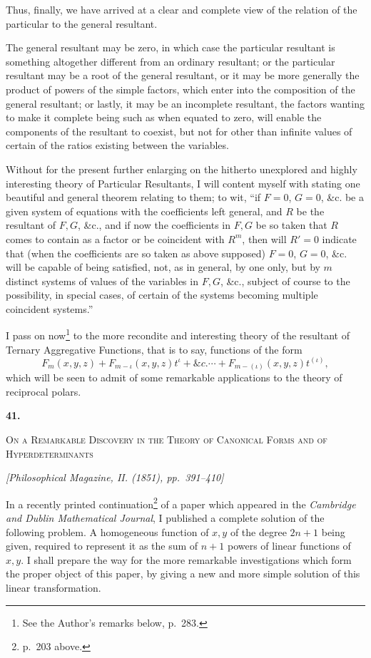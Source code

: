 \documentclass[11pt]{article}
\newcommand{\paperhead}[3]{%
  \clearpage
  \begin{center}
  {\Large\bfseries #1.}\par\vspace{0.85em}
  {\large\scshape #2}\par\vspace{0.6em}
  {\itshape [#3]}\par
  \end{center}\vspace{0.4em}}
\newcommand{\sourcepage}[1]{\marginpar{\scriptsize p.~#1}}
\begin{document}
{{Thus, finally, we have arrived at a clear and complete view of the relation of the particular to the general resultant.

The general resultant may be zero, in which case the particular resultant is something altogether different from an ordinary resultant; or the particular resultant may be a root of the general resultant, or it may be more generally the product of powers of the simple factors, which enter into the composition of the general resultant; or lastly, it may be an incomplete resultant, the factors wanting to make it complete being such as when equated to zero, will enable the components of the resultant to coexist, but not for other than infinite values of certain of the ratios existing between the variables.

Without for the present further enlarging on the hitherto unexplored and highly interesting theory of Particular Resultants, I will content myself with stating one beautiful and general theorem relating to them; to wit, ``if $F=0$, $G=0$, \&c. be a given system of equations with the coefficients left general, and $R$ be the resultant of $F,G$, \&c., and if now the coefficients in $F,G$ be so taken that $R$ comes to contain as a factor or be coincident with $R^m$, then will $R'=0$ indicate that (when the coefficients are so taken as above supposed) $F=0$, $G=0$, \&c. will be capable of being satisfied, not, as in general, by one only, but by $m$ distinct systems of values of the variables in $F,G$, \&c., subject of course to the possibility, in special cases, of certain of the systems becoming multiple coincident systems.''

I pass on now\footnote{See the Author's remarks below, p.~283.} to the more recondite and interesting theory of the resultant of Ternary Aggregative Functions, that is to say, functions of the form
\[
F_m(x,y,z)+F_{m-\iota}(x,y,z)t^\iota+\&c.\cdots+F_{m-(\iota)}(x,y,z)t^{(\iota)},
\]
which will be seen to admit of some remarkable applications to the theory of reciprocal polars.

\paperhead{41}{On a Remarkable Discovery in the Theory of Canonical Forms and of Hyperdeterminants}{Philosophical Magazine, II. (1851), pp.~391--410}

\sourcepage{265}
In a recently printed continuation\footnote{p.~203 above.} of a paper which appeared in the \emph{Cambridge and Dublin Mathematical Journal}, I published a complete solution of the following problem. A homogeneous function of $x,y$ of the degree $2n+1$ being given, required to represent it as the sum of $n+1$ powers of linear functions of $x,y$. I shall prepare the way for the more remarkable investigations which form the proper object of this paper, by giving a new and more simple solution of this linear transformation.

}}
\end{document}
